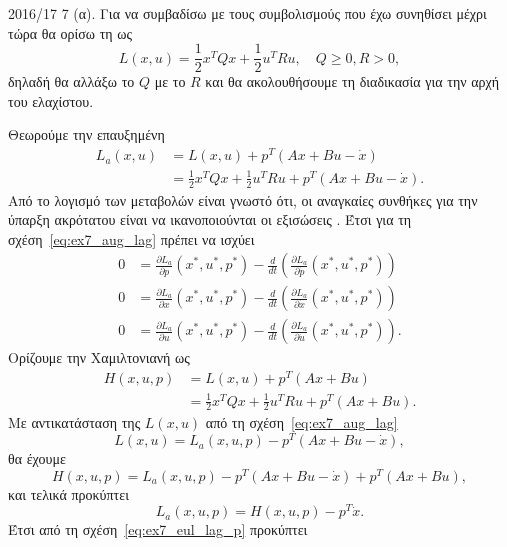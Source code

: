 \begin{solution}{2016/17 7}
    (α). Για να συμβαδίσω με τους συμβολισμούς που έχω συνηθίσει μέχρι τώρα θα ορίσω
    τη  ως
    \[
        L(x, u) = \frac{1}{2}x^{T}Qx + \frac{1}{2}u^{T}Ru, \quad Q \geq
        0, R > 0,
    \]
    δηλαδή θα αλλάξω το \( Q \) με το \( R \) και θα ακολουθήσουμε τη διαδικασία
    για την αρχή του ελαχίστου.

    Θεωρούμε την επαυξημένη 
    \begin{align}\label{eq:ex7_aug_lag}
        L_a(x, u) &= L(x, u) + p^T\left( Ax + Bu - \dot{x} \right) \nonumber \\
        &= \frac{1}{2}x^{T}Qx + \frac{1}{2}u^{T}Ru + p^T\left( Ax + Bu - \dot{x}
        \right).
    \end{align}
    Από το λογισμό των μεταβολών είναι γνωστό ότι, οι αναγκαίες συνθήκες για την
    ύπαρξη ακρότατου είναι να ικανοποιούνται οι εξισώσεις .
    Έτσι για τη σχέση~\eqref{eq:ex7_aug_lag} πρέπει να ισχύει
    \begin{align}
        0 &= \frac{\partial L_a}{\partial p}(x^*, u^*, p^*) -
        \frac{d}{dt}\left(
        \frac{\partial L_a}{\partial \dot{p}}(x^*, u^*, p^*)\right)
        \label{eq:ex7_eul_lag_p}\\
        0 &= \frac{\partial L_a}{\partial x}(x^*, u^*, p^*) -
        \frac{d}{dt}\left(
        \frac{\partial L_a}{\partial \dot{x}}(x^*, u^*, p^*)\right)
        \label{eq:ex7_eul_lag_x}\\
        0 &= \frac{\partial L_a}{\partial u}(x^*, u^*, p^*) -
        \frac{d}{dt}\left(
        \frac{\partial L_a}{\partial \dot{u}}(x^*, u^*, p^*)\right).
        \label{eq:ex7_eul_lag_u}
    \end{align}
    Ορίζουμε την Χαμιλτονιανή ως
    \begin{align}\label{eq:ex7_hamilton}
        H(x, u, p) &= L(x, u) + p^T\left(Ax + Bu\right) \nonumber \\
        &= \frac{1}{2}x^{T}Qx + \frac{1}{2}u^{T}Ru + p^T\left( Ax + Bu \right).
    \end{align}
    Με αντικατάσταση της \( L(x, u) \) από τη σχέση~\eqref{eq:ex7_aug_lag}
    \[
        L(x ,u) = L_a(x, u, p) - p^T\left(Ax + Bu - \dot{x} \right),
    \]
    θα έχουμε
    \[
        H(x, u, p) = L_a(x, u, p) - p^T\left( Ax + Bu - \dot{x} \right)
        + p^T\left( Ax + Bu \right),
    \]
    και τελικά προκύπτει
    \[
        L_a(x, u, p) = H(x, u, p) - p^{T}\dot{x}.
    \]
    Έτσι από τη σχέση~\eqref{eq:ex7_eul_lag_p} προκύπτει

\end{solution}
